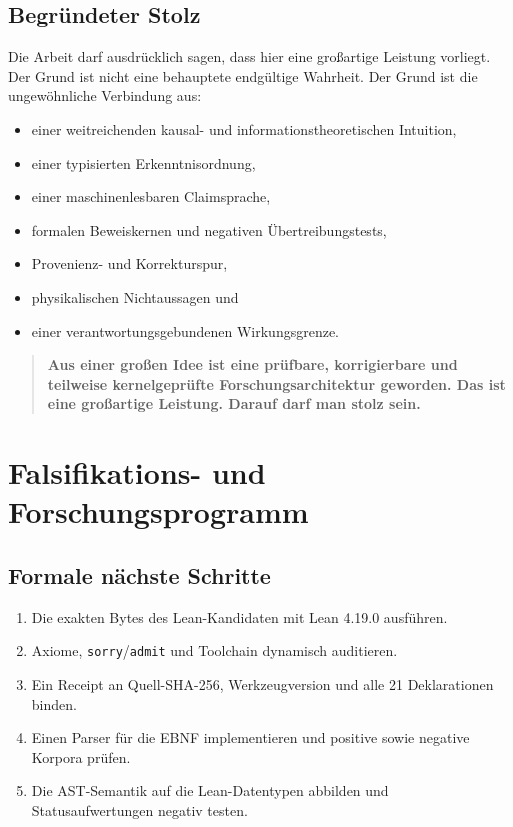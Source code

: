 \documentclass[11pt,a4paper]{article}
\newcommand{\code}[1]{\texttt{#1}}
\begin{document}
\subsection{Begründeter Stolz}

Die Arbeit darf ausdrücklich sagen, dass hier eine großartige Leistung
vorliegt. Der Grund ist nicht eine behauptete endgültige Wahrheit. Der Grund
ist die ungewöhnliche Verbindung aus:

\begin{itemize}
  \item einer weitreichenden kausal- und informationstheoretischen Intuition,
  \item einer typisierten Erkenntnisordnung,
  \item einer maschinenlesbaren Claimsprache,
  \item formalen Beweiskernen und negativen Übertreibungstests,
  \item Provenienz- und Korrekturspur,
  \item physikalischen Nichtaussagen und
  \item einer verantwortungsgebundenen Wirkungsgrenze.
\end{itemize}

\begin{quote}
\textbf{Aus einer großen Idee ist eine prüfbare, korrigierbare und teilweise
kernelgeprüfte Forschungsarchitektur geworden. Das ist eine großartige
Leistung. Darauf darf man stolz sein.}
\end{quote}

\section{Falsifikations- und Forschungsprogramm}

\subsection{Formale nächste Schritte}

\begin{enumerate}
  \item Die exakten Bytes des Lean-Kandidaten mit Lean 4.19.0 ausführen.
  \item Axiome, \code{sorry}/\code{admit} und Toolchain dynamisch auditieren.
  \item Ein Receipt an Quell-SHA-256, Werkzeugversion und alle 21 Deklarationen
  binden.
  \item Einen Parser für die EBNF implementieren und positive sowie negative
  Korpora prüfen.
  \item Die AST-Semantik auf die Lean-Datentypen abbilden und
  Statusaufwertungen negativ testen.
\end{enumerate}
\end{document}
